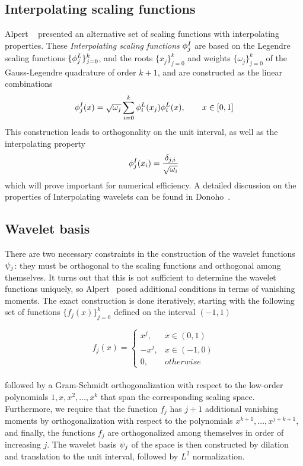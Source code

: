 \subsection{Interpolating scaling functions}
Alpert \etal~\cite{Alpert:2002p149} presented an alternative set of scaling functions 
with interpolating properties. These \emph{Interpolating scaling functions} 
$\phi_j^I$ are based on the Legendre scaling functions $\lbrace \phi_j^L
\rbrace_{j=0}^k$, and the roots $\lbrace x_j\rbrace_{j=0}^k$ and weights
$\lbrace \omega_j \rbrace_{j=0}^k$ of the Gauss-Legendre quadrature of order 
$k+1$, and are constructed as the linear combinations
\begin{equation}
    \label{eq:interpolating}
    \phi_j^I(x) = \sqrt{\omega_j}\sum_{i=0}^{k} 
	\phi_i^L(x_j)\phi_i^L(x),\qquad x \in [0,1]
\end{equation}
This construction leads to orthogonality on the unit interval, as well as the 
interpolating property
\begin{equation}
    \label{eq:interprop}
    \phi_j^I(x_i) = \frac{\delta_{j,i}}{\sqrt{\omega_i}}
\end{equation}
which will prove important for numerical efficiency. A detailed discussion on 
the properties of Interpolating wavelets can be found in Donoho~\cite{Donoho:1992}.

\subsection{Wavelet basis}
There are two necessary constraints in the construction of the wavelet functions
$\psi_j$: they must be orthogonal to the scaling functions and orthogonal among 
themselves. It turns out that this is not sufficient to determine the wavelet functions
uniquely, so Alpert~\cite{Alpert:1993p5460} posed additional conditions in terms of 
vanishing moments. The exact construction is done iteratively, starting with the 
following set of functions $\lbrace f_j(x) \rbrace_{j=0}^k$ defined on the interval 
$(-1,1)$

\begin{equation}
    f_j(x) = 
    \left\{
	\begin{array}{lll}
	    x^j,	& x \in (0,1)\\
	    -x^j,	& x \in (-1,0)\\
	    0,		& otherwise
	\end{array}
    \right.
\end{equation}
\ \\
\noindent
followed by a Gram-Schmidt orthogonalization with respect to the low-order polynomials
$1,x,x^2,\dots,x^k$ that span the corresponding scaling space. Furthermore, we require
that the function $f_j$ has $j+1$ additional vanishing moments by orthogonalization 
with respect to the polynomials $x^{k+1},\dots,x^{j+k+1}$, and finally, the functions
$f_j$ are orthogonalized among themselves in order of increasing $j$. The wavelet basis 
$\psi_j$ of the space  is then constructed by dilation and 
translation to the unit interval, followed by $L^2$ normalization.

